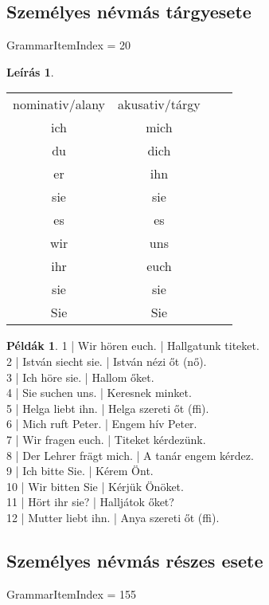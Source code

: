\documentclass{article}
\theoremstyle{definition}
\newtheorem*{exmp}{Példák}
\newtheorem*{desc}{Leírás}
\begin{document}
\subsection{Személyes névmás tárgyesete}

GrammarItemIndex = 20

\begin{desc}
\begin{tabular}{cccc}
 nominativ/alany & akusativ/tárgy \\
 ich & mich \\
 du & dich \\
 er & ihn \\
 sie & sie \\
 es & es \\
 wir & uns \\
 ihr & euch \\
 sie & sie \\
 Sie & Sie \\
\end{tabular} 
\end{desc}

\begin{exmp}
1 | Wir hören euch. | Hallgatunk titeket.\\
2 | István siecht sie. | István nézi őt (nő).\\
3 | Ich höre sie. | Hallom őket.\\
4 | Sie suchen uns. | Keresnek minket.\\
5 | Helga liebt ihn. | Helga szereti őt (ffi).\\
6 | Mich ruft Peter. | Engem hív Peter.\\
7 | Wir fragen euch. | Titeket kérdezünk.\\
8 | Der Lehrer frägt mich. | A tanár engem kérdez.\\
9 | Ich bitte Sie. | Kérem Önt.\\
10 | Wir bitten Sie | Kérjük Önöket.\\
11 | Hört ihr sie? | Halljátok őket?\\
12 | Mutter liebt ihn. | Anya szereti őt (ffi).\\
\end{exmp}

\subsection{Személyes névmás részes esete}

GrammarItemIndex = 155
\end{document}
